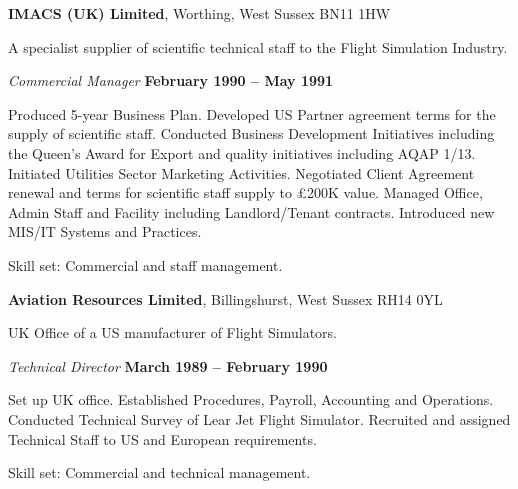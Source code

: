 \documentclass[10pt]{article}
\newenvironment{outerlist}[1][\enskip\textbullet]%
        {\begin{itemize}[#1]}{\end{itemize}%
         \vspace{-.6\baselineskip}}
\newenvironment{innerlist}[1][\enskip\textbullet]%
        {\begin{compactitem}[#1]}{\end{compactitem}}
\newcommand{\blankline}{\quad\pagebreak[2]}
\begin{document}
\blankline

\textbf{IMACS (UK) Limited}, Worthing, West Sussex BN11 1HW

A specialist supplier of scientific technical staff to the Flight Simulation Industry.

\begin{outerlist}

\item[] \textit{Commercial Manager}%
        \hfill \textbf{February 1990 -- May 1991}
\begin{innerlist}
\item Produced 5-year Business Plan. Developed US Partner agreement terms for the supply of scientific staff. Conducted Business Development Initiatives including the Queen’s Award for Export and quality initiatives including AQAP 1/13. Initiated Utilities Sector Marketing Activities. Negotiated Client Agreement renewal and terms for scientific staff supply to \pounds 200K value. Managed Office, Admin Staff and Facility including Landlord/Tenant contracts. Introduced new MIS/IT Systems and Practices.

\item Skill set: Commercial and staff management.

\end{innerlist}

\end{outerlist}

\blankline

\textbf{Aviation Resources Limited}, Billingshurst, West Sussex RH14 0YL

UK Office of a US manufacturer of Flight Simulators.

\begin{outerlist}

\item[] \textit{Technical Director}%
        \hfill \textbf{March 1989 -- February 1990}
\begin{innerlist}
\item Set up UK office. Established Procedures, Payroll, Accounting and Operations. Conducted Technical Survey of Lear Jet Flight Simulator. Recruited and assigned Technical Staff to US and European requirements.

\item Skill set: Commercial and technical management.

\end{innerlist}


\end{outerlist}
\end{document}
